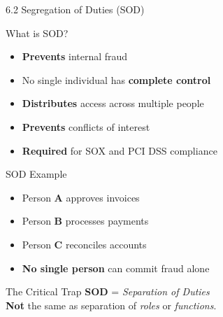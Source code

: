 \documentclass{beamer}
\begin{document}
	\begin{frame}{6.2 Segregation of Duties (SOD)}
		\begin{block}{What is SOD?}
			\begin{itemize}
				\item \textbf{Prevents} internal fraud
				\item No single individual has \textbf{complete control}
				\item \textbf{Distributes} access across multiple people
				\item \textbf{Prevents} conflicts of interest
				\item \textbf{Required} for SOX and PCI DSS compliance
			\end{itemize}
		\end{block}
		
		\begin{block}{SOD Example}
			\begin{itemize}
				\item Person \textbf{A} approves invoices
				\item Person \textbf{B} processes payments
				\item Person \textbf{C} reconciles accounts
				\item \textbf{No single person} can commit fraud alone
			\end{itemize}
		\end{block}
		
		\begin{alertblock}{The Critical Trap}
			\textbf{SOD} = \textit{Separation of Duties} \\
			\textbf{Not} the same as separation of \textit{roles} or \textit{functions}.
		\end{alertblock}
	\end{frame}
	
\end{document}
